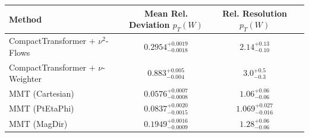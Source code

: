     \begin{tabular}{lccc}
        \toprule
        Method & Mean Rel. Deviation $p_{T}(W)$ & Rel. Resolution $p_{T}(W)$ \\
        \midrule
        CompactTransformer + $\nu^2$-Flows & $0.2954^{+0.0019}_{-0.0018}$ & $2.14^{+0.13}_{-0.10}$ \\
        CompactTransformer + $\nu$-Weighter & $0.883^{+0.005}_{-0.004}$ & $3.0^{+0.5}_{-0.3}$ \\
        MMT (Cartesian) & $0.0576^{+0.0007}_{-0.0008}$ & $1.06^{+0.06}_{-0.06}$ \\
        MMT (PtEtaPhi) & $0.0837^{+0.0020}_{-0.0015}$ & $1.069^{+0.027}_{-0.016}$ \\
        MMT (MagDir) & $0.1949^{+0.0016}_{-0.0009}$ & $1.28^{+0.06}_{-0.06}$ \\
        \bottomrule
    \end{tabular}